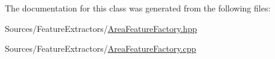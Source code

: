 The documentation for this class was generated from the following files\+:\begin{DoxyCompactItemize}
\item 
Sources/\+Feature\+Extractors/\hyperlink{_area_feature_factory_8hpp}{Area\+Feature\+Factory.\+hpp}\item 
Sources/\+Feature\+Extractors/\hyperlink{_area_feature_factory_8cpp}{Area\+Feature\+Factory.\+cpp}\end{DoxyCompactItemize}
